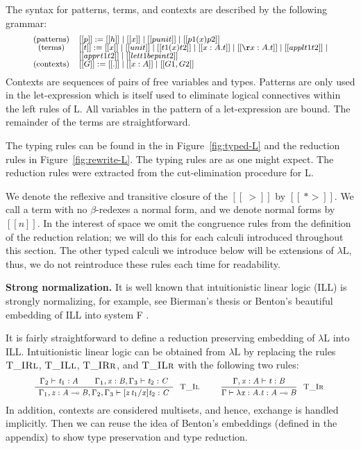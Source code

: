 \documentclass{entcs}
\begin{document}
The syntax for patterns, terms, and contexts are described by the
following grammar:
\vspace{-10px}
\[ \small
\begin{array}{cll}
  \text{(patterns)} & [[p]] := [[h]] \mid [[x]] \mid [[punit]] \mid [[p1 (x) p2]]\\
  \text{(terms)}    & [[t]] := [[x]] \mid [[unit]] \mid [[t1 (x) t2]] \mid [[\l x : A.t]] \mid [[\r x : A.t]] \mid
  [[appl t1 t2]] \mid \\ & [[appr t1 t2]] \mid [[let t1 be p in t2]]\\
  \text{(contexts)} & [[G]] := [[.]] \mid [[x : A]] \mid [[G1,G2]]\\
\end{array}
\vspace{-10px}
\]
Contexts are sequences of pairs of free variables and types.  Patterns
are only used in the let-expression which is itself used to eliminate
logical connectives within the left rules of L.  All variables in the
pattern of a let-expression are bound.  The remainder of the terms are
straightforward.

The typing rules can be found in the in Figure~\ref{fig:typed-L} and
the reduction rules in Figure~\ref{fig:rewrite-L}. The typing rules
are as one might expect.  The reduction rules were extracted from the
cut-elimination procedure for L.

We denote the reflexive and transitive closure of the $[[~>]]$ by
$[[~*>]]$.  We call a term with no $\beta$-redexes a normal form,
and we denote normal forms by $[[n]]$.  In the interest of space we
omit the congruence rules from the definition of the reduction
relation; we will do this for each calculi introduced throughout this
section.  The other typed calculi we introduce below will be
extensions of $\lambda\text{L}$, thus, we do not reintroduce these
rules each time for readability.

\textbf{Strong normalization.}  It is well known that intuitionistic
linear logic (ILL) is strongly normalizing, for example, see Bierman's
thesis \cite{Bierman:1994} or Benton's beautiful embedding of ILL into
system F \cite{Benton:1995c}.  

It is fairly straightforward to define a reduction preserving
embedding of $\lambda\text{L}$ into ILL.  Intuitionistic linear logic
can be obtained from $\lambda\text{L}$ by replacing the rules
$\textsc{T\_IRl}$, $\textsc{T\_ILl}$, $\textsc{T\_IRr}$,
and $\textsc{T\_ILr}$ with the following two rules:
\[ \small
\begin{array}{cccccccc} 
  \LdruleTXXIl{} & \quad \LdruleTXXIr{}
\end{array}
\]
In addition, contexts are considered multisets, and hence, exchange is
handled implicitly. Then we can reuse the idea of Benton's embeddings
(defined in the appendix) to show type preservation and type
reduction.
\end{document}
